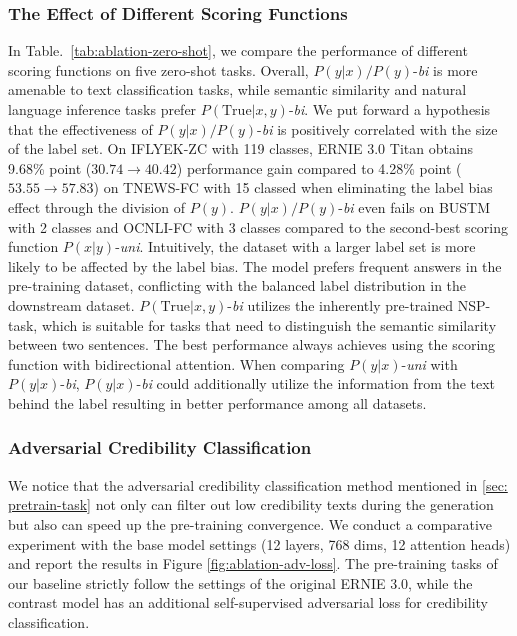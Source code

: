 \subsubsection{The Effect of Different Scoring Functions}\label{sec: analysis-scoring-function}

In Table.~\ref{tab:ablation-zero-shot}, we compare the performance of different scoring functions on five zero-shot tasks. Overall, $P(y|x)/P(y)$-\textit{bi} is more amenable to text classification tasks, while semantic similarity and natural language inference tasks prefer $P(\text{True}|x, y)$-\textit{bi}. We put forward a hypothesis that the effectiveness of $P(y|x)/P(y)$-\textit{bi} is positively correlated with the size of the label set. On IFLYEK-ZC with 119 classes, ERNIE 3.0 Titan obtains 9.68\% point ($30.74 \rightarrow 40.42$) performance gain compared to 4.28\% point ($53.55 \rightarrow 57.83$) on TNEWS-FC with 15 classed when eliminating the label bias effect through the division of $P(y)$. $P(y|x)/P(y)$-\textit{bi} even fails on BUSTM with 2 classes and OCNLI-FC with 3 classes compared to the second-best scoring function $P(x|y)$-\textit{uni}. Intuitively, the dataset with a larger label set is more likely to be affected by the label bias. The model prefers frequent answers in the pre-training dataset, conflicting with the balanced label distribution in the downstream dataset. $P(\text{True}|x, y)$-\textit{bi} utilizes the inherently pre-trained NSP-task, which is suitable for tasks that need to distinguish the semantic similarity between two sentences. The best performance always achieves using the scoring function with bidirectional attention. When comparing $P(y|x)$-\textit{uni} with $P(y|x)$-\textit{bi}, $P(y|x)$-\textit{bi} could additionally utilize the information from the text behind the label resulting in better performance among all datasets.

\subsubsection{Adversarial Credibility Classification}\label{sec: adv}

We notice that the adversarial credibility classification method mentioned in \ref{sec: pretrain-task} not only can filter out low credibility texts during the generation but also can speed up the pre-training convergence. We conduct a comparative experiment with the base model settings (12 layers, 768 dims, 12 attention heads) and report the results in Figure \ref{fig:ablation-adv-loss}. The pre-training tasks of our baseline strictly follow the settings of the original ERNIE 3.0, while the contrast model has an additional self-supervised adversarial loss for credibility classification.

